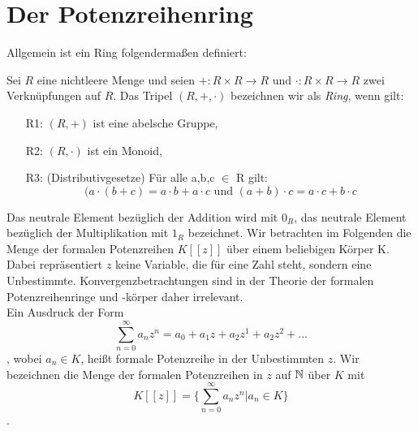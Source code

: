 \section{Der Potenzreihenring}\label{potenzreihenring}
Allgemein ist ein Ring folgendermaßen definiert:
\begin{defn}\label{Ring} %
Sei $R$ eine nichtleere Menge und seien $+ : R \times R \to R \text{ und } \cdot: R \times R \to R $ zwei Verknüpfungen auf $R$. Das Tripel $\left(R, +, \cdot\right)$ bezeichnen wir als \textit{Ring}, wenn gilt:
%
\begin{enumerate}
\item[R1:] $(R, +)$ ist eine abelsche Gruppe,
\item[R2:] $\left(R, \cdot\right)$ ist ein Monoid,
\item[R3:] (Distributivgesetze) Für alle a,b,c $\in$ R gilt:\\
\[(a \cdot(b +c) = a \cdot b + a \cdot c \text{ und }
(a+b) \cdot c = a \cdot c + b \cdot c \] 
\end{enumerate}
\end{defn}
Das neutrale Element bezüglich der Addition wird mit \textbf{$0_R$}, das neutrale Element bezüglich der Multiplikation mit \textbf{$1_R$} bezeichnet.
%
Wir betrachten im Folgenden die Menge der formalen Potenzreihen $K[[z]]$ über einem beliebigen Körper K. Dabei repräsentiert $z$ keine Variable, die für eine Zahl steht, sondern eine Unbestimmte. Konvergenzbetrachtungen sind in der Theorie der formalen Potenzreihenringe und -körper daher irrelevant. \\
Ein Ausdruck der Form
\begin{equation}\label{eq: formalepotenzreihe}\sum_{n=0}^\infty a_n z^n = a_0 + a_1z + a_2z^1 + a_2z^2 + ...\end{equation},
wobei $a_n \in K$, heißt formale Potenzreihe in der Unbestimmten $z$.
Wir bezeichnen die Menge der formalen Potenzreihen in $z$ auf $\mathbb{N}$ über $K$ mit \[K [[z]] = \lbrace \sum_{n=0}^\infty a_n z^n \vert a_n\in K \rbrace \]. 


